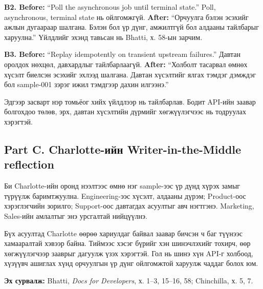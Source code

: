 \documentclass[11pt,a4paper]{article}
\begin{document}
\textbf{B2. Before:} ``Poll the asynchronous job until terminal state.'' Poll, asynchronous, terminal state нь ойлгомжгүй. \textbf{After:} ``Орчуулга бэлэн эсэхийг ажлын дугаараар шалгана. Бэлэн бол үр дүнг, амжилтгүй бол алдааны тайлбарыг харуулна.'' Үйлдлийг эхэнд тавьсан нь Bhatti, х. 58-ын зарчим.

\textbf{B3. Before:} ``Replay idempotently on transient upstream failures.'' Давтан оролдох нөхцөл, давхардлыг тайлбарлаагүй. \textbf{After:} ``Холболт тасарвал өмнөх хүсэлт биелсэн эсэхийг эхлээд шалгана. Давтан хүсэлтийг ялгах тэмдэг дэмждэг бол sample-001 зэрэг ижил тэмдгээр дахин илгээнэ.''

Эдгээр засварт нэр томьёог хийх үйлдлээр нь тайлбарлав. Бодит API-ийн заавар болгохдоо төлөв, эрх, давтан хүсэлтийн дүрмийг хөгжүүлэгчээс нь тодруулах хэрэгтэй.
\subsection*{Part C. Charlotte-ийн Writer-in-the-Middle reflection}
Би Charlotte-ийн оронд нээлтээс өмнө нэг sample-ээс үр дүнд хүрэх замыг түрүүлж баримтжуулна. Engineering-ээс хүсэлт, алдааны дүрэм; Product-оос хэрэглэгчийн зорилго; Support-оос давтагдах асуултыг авч нэгтгэнэ. Marketing, Sales-ийн амлалтыг энэ урсгалтай нийцүүлнэ.

Бүх асуултад Charlotte өөрөө хариулдаг байвал заавар бичсэн ч баг түүнээс хамааралтай хэвээр байна. Тиймээс хэсэг бүрийг хэн шинэчлэхийг тохирч, өөр хөгжүүлэгчээр зааврыг дагуулж үзэх хэрэгтэй. Гол нь шинэ хүн API-г холбоод, хүзүүвч ашиглах хүнд орчуулгын үр дүнг ойлгомжтой харуулж чаддаг болох юм.

\textbf{Эх сурвалж:} Bhatti, \textit{Docs for Developers}, х. 1--3, 15--16, 58; Chinchilla, х. 5, 7.
\end{document}
